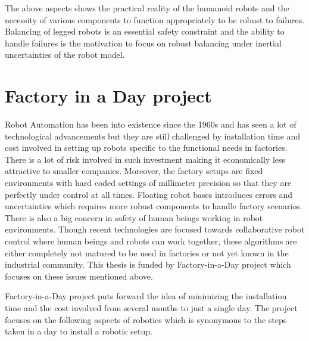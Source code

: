 \documentclass[a4paper,11pt,twoside]{StyleThese}
\begin{document}
The above aspects shows the practical reality of the humanoid robots and the necessity of various components to function appropriately to be robust to failures. Balancing of legged robots is an essential safety constraint and the ability to handle failures is the motivation to focus on robust   balancing under inertial uncertainties of the robot model.  

\section{Factory in a Day project}
Robot Automation has been into existence since the 1960s and has seen a lot of technological advancements but they are still challenged by installation time and cost involved in setting up robots specific to the functional needs in factories. There is a lot of risk involved in such investment making it economically less attractive to smaller companies. Moreover, the factory setups are fixed environments with hard coded settings of millimeter precision so that they are perfectly under control at all times. Floating robot bases introduces errors and uncertainties which requires more robust components to handle factory scenarios. There is also a big concern in safety of human beings working in robot environments. Though recent technologies are focused towards collaborative robot control where human beings and robots can work together, these algorithms are either completely not matured to be used in factories or not yet known in the industrial community. This thesis is funded by Factory-in-a-Day project which focuses on these issues mentioned above.

Factory-in-a-Day project puts forward the idea of minimizing the installation time and the cost involved from several months to just a single day. The project focuses on the following aspects of 
robotics which is synonymous to the steps taken in a day to install a robotic setup. 
\end{document}
